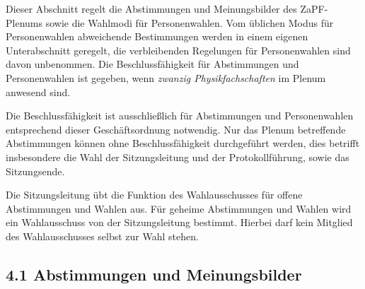 \documentclass[12pt,oneside]{scrartcl}
\begin{document}
Dieser Abschnitt regelt die Abstimmungen und Meinungsbilder des ZaPF-Plenums
sowie die Wahlmodi für Personenwahlen. Vom üblichen Modus für Personenwahlen
abweichende Bestimmungen werden in einem eigenen Unterabschnitt geregelt, die
verbleibenden Regelungen für Personenwahlen sind davon unbenommen. Die
Beschlussfähigkeit für Abstimmungen und Personenwahlen ist gegeben, wenn
\emph{zwanzig Physikfachschaften} im Plenum anwesend sind.

Die Beschlussfähigkeit ist ausschließlich für Abstimmungen und Personenwahlen
entsprechend dieser Geschäftsordnung notwendig.
Nur das Plenum betreffende Abstimmungen können ohne Beschlussfähigkeit
durchgeführt werden, dies betrifft insbesondere die Wahl der Sitzungsleitung und der
Protokollführung, sowie das Sitzungsende.

Die Sitzungsleitung übt die Funktion des Wahlausschusses für offene Abstimmungen und
Wahlen aus. Für geheime Abstimmungen und Wahlen wird ein Wahlausschuss von der
Sitzungsleitung bestimmt. Hierbei darf kein Mitglied des Wahlausschusses selbst zur
Wahl stehen.


\subsection{4.1 Abstimmungen und Meinungsbilder%
  \label{abstimmungen-und-meinungsbilder}%
}
\end{document}
